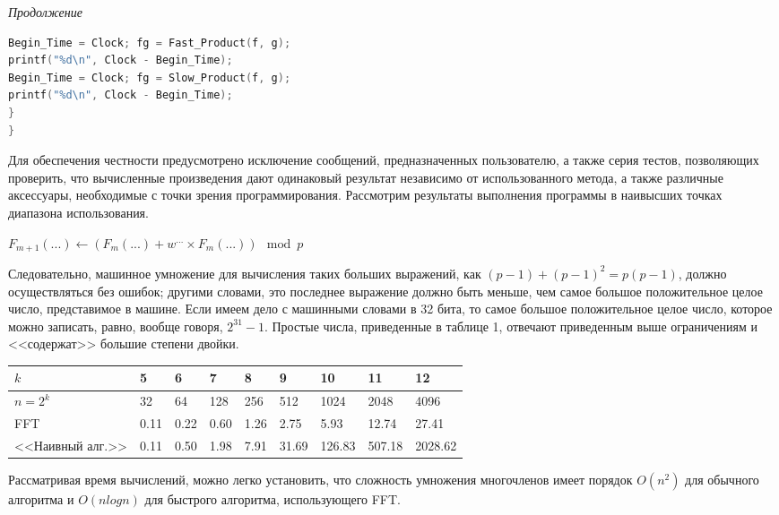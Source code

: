 \documentclass{mai_book}
\begin{document}
	\textit{Продолжение}


\begin{lstlisting}[language=C,
basicstyle=\scriptsize,
linewidth=7cm,
belowskip=-1em,
mathescape=true]
Begin_Time = Clock; fg = Fast_Product(f, g);
printf("%d\n", Clock - Begin_Time);
Begin_Time = Clock; fg = Slow_Product(f, g);
printf("%d\n", Clock - Begin_Time);
}
}
\end{lstlisting}

\bigskip
	
	Для обеспечения честности предусмотрено исключение сообщений, предназначенных пользователю, а также серия тестов, позволяющих проверить, что вычисленные произведения дают одинаковый результат независимо от использованного метода, а также различные аксессуары, необходимые с точки зрения программирования. Рассмотрим результаты выполнения программы в наивысших точках диапазона использования.
	
		\begin{center}
		$F_{m+1}(...) \leftarrow (F_{m}(...) + w^{...} \times F_{m}(...)) \mod p$
	\end{center}
	\smallskip
	Следовательно, машинное умножение для вычисления таких больших выражений, как $(p-1) + (p-1)^2 = p(p-1)$, должно осуществляться без ошибок; другими словами, это последнее выражение должно быть меньше, чем самое большое положительное целое число, представимое в машине. Если имеем дело с машинными словами в 32 бита, то самое большое положительное целое число, которое можно записать, равно, вообще говоря, $2^{31} - 1$. Простые числа, приведенные в таблице 1, отвечают приведенным выше ограничениям и <<содержат>> большие степени двойки.
	\begin{center}
		\begin{tabular}[t]{|p{8em}|p{2em}|p{2em}|p{2em}|p{2em}|p{2em}|p{3em}|p{3em}|p{3em}|}
			\hline 
			$k$ & 5 & 6 & 7 & 8 & 9 & 10 & 11 & 12 \\ 
			\hline
			$n = 2^k$ & 32& 64& 128 &256 &512& 1024& 2048 &4096 \\
			\hline
			FFT & 0.11 &0.22& 0.60 &1.26 &2.75 &5.93 &12.74 &27.41\\
			\hline
			<<Наивный алг.>> & 0.11 &0.50& 1.98& 7.91& 31.69 &126.83& 507.18& 2028.62 \\
			\hline
		\end{tabular}
	\end{center}
	
	Рассматривая время вычислений, можно легко установить, что сложность умножения многочленов имеет порядок $O(n^2)$ для обычного алгоритма и $O(nlogn)$ для быстрого алгоритма, использующего FFT.
	
\end{document}
